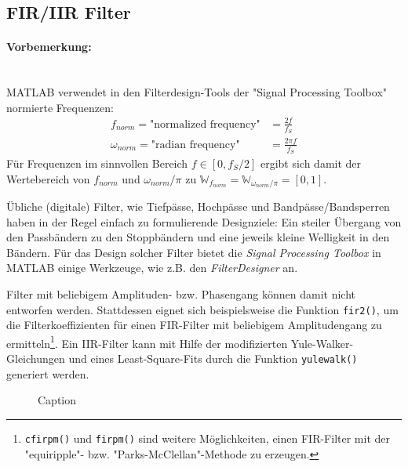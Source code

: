 \subsection{FIR/IIR Filter}

\paragraph{Vorbemerkung:}\mbox{}\\
MATLAB verwendet in den Filterdesign-Tools der "Signal Processing Toolbox" normierte Frequenzen:
\begin{subequations}
	\begin{align}
	f_{norm} = \text{"normalized frequency"} &= \frac{2f}{f_S} \\
	\omega_{norm} = \text{"radian frequency"} &= \frac{2\pi f}{f_S}
	\end{align}
\end{subequations}
Für Frequenzen im sinnvollen Bereich $f\in [0,f_S/2]$ ergibt sich damit der Wertebereich von
$f_{norm}$ und $\omega_{norm}/\pi$ zu $\mathbb{W}_{f_{norm}}=\mathbb{W}_{\omega_{norm}/\pi}=[0,1]$.

Übliche (digitale) Filter, wie Tiefpässe, Hochpässe und Bandpässe/Bandsperren haben in der Regel einfach zu formulierende Designziele: Ein steiler Übergang von den Passbändern zu den Stoppbändern und eine jeweils kleine Welligkeit in den Bändern.
Für das Design solcher Filter bietet die \textit{Signal Processing Toolbox} in MATLAB einige Werkzeuge, wie z.B. den \textit{FilterDesigner} an.

Filter mit beliebigem Amplituden- bzw. Phasengang können damit nicht entworfen werden. Stattdessen eignet sich beispielsweise die Funktion \texttt{fir2()}, um die Filterkoeffizienten für einen FIR-Filter mit beliebigem Amplitudengang zu ermitteln\footnote{\texttt{cfirpm()} und \texttt{firpm()} sind weitere Möglichkeiten, einen FIR-Filter mit der "equiripple"- bzw. "Parks-McClellan"-Methode zu erzeugen.}. Ein IIR-Filter kann mit Hilfe der modifizierten Yule-Walker-Gleichungen und eines Least-Square-Fits durch die Funktion \texttt{yulewalk()} generiert werden.

\begin{figure}[H]
	\centering
	\hfill
	\caption{Caption}
	\label{firIirPhasenoise}
\end{figure}


